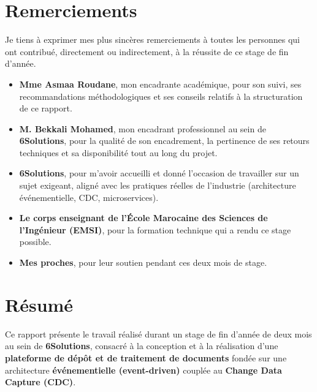 \documentclass[12pt,a4paper,openany]{report}
\begin{document}
    \newpage
    \chapter*{Remerciements}

    Je tiens \`a exprimer mes plus sinc\`eres remerciements \`a toutes les personnes qui ont contribu\'e, directement ou indirectement, \`a la r\'eussite de ce stage de fin d'ann\'ee.

    \begin{itemize}[leftmargin=2em]
      \item \textbf{Mme Asmaa Roudane}, mon encadrante acad\'emique, pour son suivi, ses recommandations m\'ethodologiques et ses conseils relatifs \`a la structuration de ce rapport.

      \item \textbf{M. Bekkali Mohamed}, mon encadrant professionnel au sein de \textbf{6Solutions}, pour la qualit\'e de son encadrement, la pertinence de ses retours techniques et sa disponibilit\'e tout au long du projet.

      \item \textbf{6Solutions}, pour m'avoir accueilli et donn\'e l'occasion de travailler sur un sujet exigeant, align\'e avec les pratiques r\'eelles de l'industrie (architecture \'ev\'enementielle, CDC, microservices).

      \item \textbf{Le corps enseignant de l'\'Ecole Marocaine des Sciences de l'Ing\'enieur (EMSI)}, pour la formation technique qui a rendu ce stage possible.

      \item \textbf{Mes proches}, pour leur soutien pendant ces deux mois de stage.
    \end{itemize}

    \newpage
    \chapter*{R\'esum\'e}

    \noindent Ce rapport pr\'esente le travail r\'ealis\'e durant un stage de fin d'ann\'ee de deux mois au sein de \textbf{6Solutions}, consacr\'e \`a la conception et \`a la r\'ealisation d'une \textbf{plateforme de d\'ep\^ot et de traitement de documents} fond\'ee sur une architecture \textbf{\'ev\'enementielle (event-driven)} coupl\'ee au \textbf{Change Data Capture (CDC)}.
\end{document}
